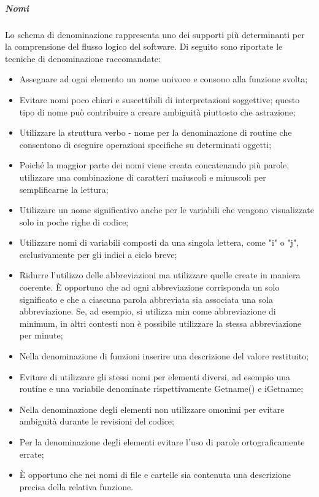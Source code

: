 \documentclass[../NormeDiProgetto_v4.0.0.tex]{subfiles}
\begin{document}
                  \subparagraph{Nomi}
                  Lo schema di denominazione rappresenta uno dei supporti più determinanti per la comprensione del flusso logico del software. Di seguito sono riportate le tecniche di denominazione raccomandate:
                  \begin{itemize}
                        \item Assegnare ad ogni elemento un nome univoco e consono alla funzione svolta;
                        \item Evitare nomi poco chiari e suscettibili di interpretazioni soggettive; questo tipo di nome può contribuire a creare ambiguità piuttosto che astrazione;
                        \item Utilizzare la struttura verbo - nome per la denominazione di routine che consentono di eseguire operazioni specifiche su determinati oggetti;
                        \item Poiché la maggior parte dei nomi viene creata concatenando più parole, utilizzare una combinazione di caratteri maiuscoli e minuscoli per semplificarne la lettura;
                        \item Utilizzare un nome significativo anche per le variabili che vengono visualizzate solo in poche righe di codice;
                        \item Utilizzare nomi di variabili composti da una singola lettera, come "i" o "j", esclusivamente per gli indici a ciclo breve;
                        \item Ridurre l'utilizzo delle abbreviazioni ma utilizzare quelle create in maniera coerente. È opportuno che ad ogni abbreviazione corrisponda un solo significato e che a ciascuna parola abbreviata sia associata una sola abbreviazione. Se, ad esempio, si utilizza min come abbreviazione di minimum, in altri contesti non è possibile utilizzare la stessa abbreviazione per minute;
                        \item Nella denominazione di funzioni inserire una descrizione del valore restituito;
                        \item Evitare di utilizzare gli stessi nomi per elementi diversi, ad esempio una routine e una variabile denominate rispettivamente Getname() e iGetname;
                        \item Nella denominazione degli elementi non utilizzare omonimi per evitare ambiguità durante le revisioni del codice;
                        \item Per la denominazione degli elementi evitare l'uso di parole ortograficamente errate;
                        \item È opportuno che nei nomi di file e cartelle sia contenuta una descrizione precisa della relativa funzione.
                  \end{itemize}
\end{document}
